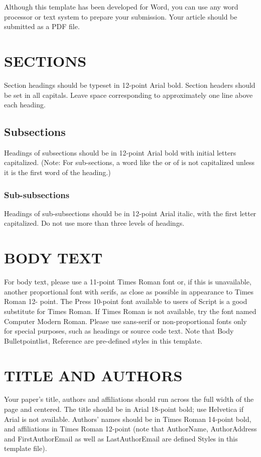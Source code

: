 \documentclass[11pt]{article}
\begin{document}
Although this template has been developed for Word, you can use any word processor or
text system to prepare your submission. Your article should be submitted as a PDF file.
\section*{SECTIONS}
Section headings should be typeset in 12-point Arial bold. Section headers should be set
in all capitals. Leave space corresponding to approximately one line above each heading.
\subsection*{Subsections}
Headings of subsections should be in 12-point Arial bold with initial letters capitalized.
(Note: For sub-sections, a word like the or of is not capitalized unless it is the first word
of the heading.)
\subsubsection*{Sub-subsections}
Headings of sub-subsections should be in 12-point Arial italic, with the first letter
capitalized. Do not use more than three levels of headings.
\section*{BODY TEXT}
For body text, please use a 11-point Times Roman font or, if this is unavailable, another
proportional font with serifs, as close as possible in appearance to Times Roman 12-
point. The Press 10-point font available to users of Script is a good substitute for Times
Roman. If Times Roman is not available, try the font named Computer Modern Roman.
Please use sans-serif or non-proportional fonts only for special purposes, such as
headings or source code text. Note that Body Bulletpointlist, Reference are pre-defined
styles in this template.
\section*{TITLE AND AUTHORS}
Your paper’s title, authors and affiliations should run across the full width of the page
and centered. The title should be in Arial 18-point bold; use Helvetica if Arial is not
available. Authors’ names should be in Times Roman 14-point bold, and affiliations in
Times Roman 12-point (note that AuthorName, AuthorAddress and FirstAuthorEmail as
well as LastAuthorEmail are defined Styles in this template file).
\end{document}
